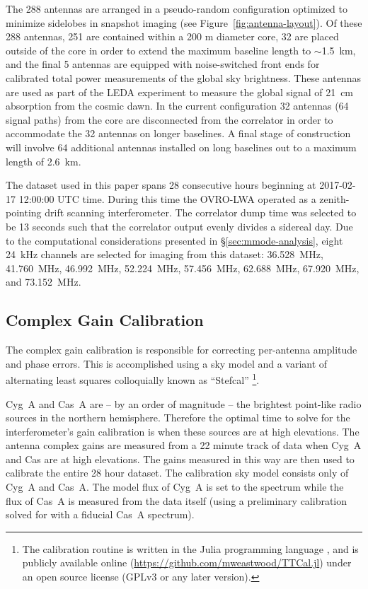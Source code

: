 \documentclass[twocolumn]{aastex61}
\begin{document}
The 288 antennas are arranged in a pseudo-random configuration optimized to minimize sidelobes in
snapshot imaging (see Figure~\ref{fig:antenna-layout}).  Of these 288 antennas, 251 are contained
within a 200 m diameter core, 32 are placed outside of the core in order to extend the maximum
baseline length to $\sim$1.5~km, and the final 5 antennas are equipped with noise-switched front
ends for calibrated total power measurements of the global sky brightness.  These antennas are used
as part of the LEDA experiment \citep{2017arXiv170909313P} to measure the global signal of 21~cm
absorption from the cosmic dawn. In the current configuration 32 antennas (64 signal paths) from the
core are disconnected from the correlator in order to accommodate the 32 antennas on longer
baselines. A final stage of construction will involve 64 additional antennas installed on long
baselines out to a maximum length of 2.6~km.

The dataset used in this paper spans 28 consecutive hours beginning at 2017-02-17 12:00:00 UTC time.
During this time the OVRO-LWA operated as a zenith-pointing drift scanning interferometer.  The
correlator dump time was selected to be 13 seconds such that the correlator output evenly divides a
sidereal day. Due to the computational considerations presented in \S\ref{sec:mmode-analysis}, eight
24~kHz channels are selected for imaging from this dataset: 36.528~MHz, 41.760~MHz, 46.992~MHz,
52.224~MHz, 57.456~MHz, 62.688~MHz, 67.920~MHz, and 73.152~MHz.

\subsection{Complex Gain Calibration}\label{sec:gaincal}

The complex gain calibration is responsible for correcting per-antenna amplitude and phase errors.
This is accomplished using a sky model and a variant of alternating least squares colloquially known
as ``Stefcal''
\citep{2008ISTSP...2..707M, 2014A&A...571A..97S}\footnote{
    The calibration routine is written in the Julia programming language
    \citep{doi:10.1137/141000671}, and is publicly available online
    (\url{https://github.com/mweastwood/TTCal.jl}) under an open source license (GPLv3 or any later
    version).
}.

Cyg~A and Cas~A are -- by an order of magnitude -- the brightest point-like radio sources in the
northern hemisphere. Therefore the optimal time to solve for the interferometer's gain calibration
is when these sources are at high elevations.  The antenna complex gains are measured from a 22
minute track of data when Cyg~A and Cas are at high elevations. The gains measured in this way are
then used to calibrate the entire 28 hour dataset. The calibration sky model consists only of Cyg~A
and Cas~A. The model flux of Cyg~A is set to the \citet{1977A&A....61...99B} spectrum while the flux
of Cas~A is measured from the data itself (using a preliminary calibration solved for with a
fiducial Cas~A spectrum).
\end{document}
